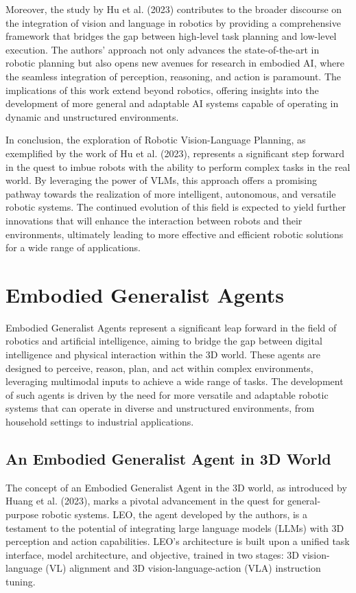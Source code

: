 \documentclass[a4paper]{article}
\begin{document}
Moreover, the study by Hu et al. (2023) contributes to the broader discourse on the integration of vision and language in robotics by providing a comprehensive framework that bridges the gap between high-level task planning and low-level execution. The authors' approach not only advances the state-of-the-art in robotic planning but also opens new avenues for research in embodied AI, where the seamless integration of perception, reasoning, and action is paramount. The implications of this work extend beyond robotics, offering insights into the development of more general and adaptable AI systems capable of operating in dynamic and unstructured environments.

In conclusion, the exploration of Robotic Vision-Language Planning, as exemplified by the work of Hu et al. (2023), represents a significant step forward in the quest to imbue robots with the ability to perform complex tasks in the real world. By leveraging the power of VLMs, this approach offers a promising pathway towards the realization of more intelligent, autonomous, and versatile robotic systems. The continued evolution of this field is expected to yield further innovations that will enhance the interaction between robots and their environments, ultimately leading to more effective and efficient robotic solutions for a wide range of applications.
\section{Embodied Generalist Agents}
Embodied Generalist Agents represent a significant leap forward in the field of robotics and artificial intelligence, aiming to bridge the gap between digital intelligence and physical interaction within the 3D world. These agents are designed to perceive, reason, plan, and act within complex environments, leveraging multimodal inputs to achieve a wide range of tasks. The development of such agents is driven by the need for more versatile and adaptable robotic systems that can operate in diverse and unstructured environments, from household settings to industrial applications.

\subsection{An Embodied Generalist Agent in 3D World}
The concept of an Embodied Generalist Agent in the 3D world, as introduced by Huang et al. (2023), marks a pivotal advancement in the quest for general-purpose robotic systems. LEO, the agent developed by the authors, is a testament to the potential of integrating large language models (LLMs) with 3D perception and action capabilities. LEO's architecture is built upon a unified task interface, model architecture, and objective, trained in two stages: 3D vision-language (VL) alignment and 3D vision-language-action (VLA) instruction tuning.
\end{document}
